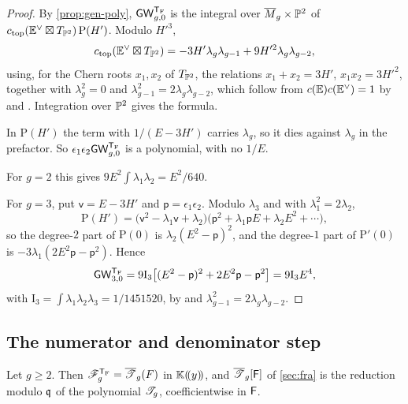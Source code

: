 \begin{proof}
By \cref{prop:gen-poly}, $\mathsf{GW}_{g,0}^{\mathsf{T}_{\mathrm{F}}}$ is the integral over $\overline{M}_g\times\mathbb{P}^2$ of $c_{\mathrm{top}}(\mathbb{E}^\vee\boxtimes T_{\mathbb{P}^2})\,\mathrm{P}(H')$. Modulo $H'^3$,
\[
c_{\mathrm{top}}(\mathbb{E}^\vee\boxtimes T_{\mathbb{P}^2})=-3H'\lambda_g\lambda_{g-1}+9H'^2\lambda_g\lambda_{g-2},
\]
using, for the Chern roots $x_1,x_2$ of $T_{\mathbb{P}^2}$, the relations $x_1+x_2=3H'$, $x_1x_2=3H'^2$, together with $\lambda_g^2=0$ and $\lambda_{g-1}^2=2\lambda_g\lambda_{g-2}$, which follow from $c(\mathbb{E})c(\mathbb{E}^\vee)=1$ by \cite[(5.4), (5.5)]{Mum83} and \cite[Section~2, before (22)]{FP00}. Integration over $\mathbb{P}^2$ gives the formula.

In $\mathrm{P}(H')$ the term with $1/(E-3H')$ carries $\lambda_g$, so it dies against $\lambda_g$ in the prefactor. So $\epsilon_1\epsilon_2\mathsf{GW}_{g,0}^{\mathsf{T}_{\mathrm{F}}}$ is a polynomial, with no $1/E$.

For $g=2$ this gives $9E^2\int\lambda_1\lambda_2=E^2/640$.

For $g=3$, put $\mathsf{v}=E-3H'$ and $\mathsf{p}=\epsilon_1\epsilon_2$. Modulo $\lambda_3$ and with $\lambda_1^2=2\lambda_2$,
\[
\mathrm{P}(H')=\big(\mathsf{v}^2-\lambda_1\mathsf{v}+\lambda_2\big)\big(\mathsf{p}^2+\lambda_1\mathsf{p}E+\lambda_2E^2+\cdots\big),
\]
so the degree-$2$ part of $\mathrm{P}(0)$ is $\lambda_2(E^2-\mathsf{p})^2$, and the degree-$1$ part of $\mathrm{P}'(0)$ is $-3\lambda_1(2E^2\mathsf{p}-\mathsf{p}^2)$. Hence
\[
\mathsf{GW}_{3,0}^{\mathsf{T}_{\mathrm{F}}}=9\mathrm{I}_3\big[(E^2-\mathsf{p})^2+2E^2\mathsf{p}-\mathsf{p}^2\big]=9\mathrm{I}_3E^4,
\]
with $\mathrm{I}_3=\int\lambda_1\lambda_2\lambda_3=1/1451520$, by \cite[Theorem~4]{FP00} and $\lambda_{g-1}^2=2\lambda_g\lambda_{g-2}$.
\end{proof}

\subsection{The numerator and denominator step}

\begin{lem}
\label{lem:spe-numden}
Let $g\geq2$. Then $\mathscr{F}_g^{\mathsf{T}_{\mathrm{F}}}=\overline{\mathscr{T}}_g(F)$ in $\mathbb{K}(\!(y)\!)$, and $\overline{\mathscr{T}}_g[\mathsf{F}]$ of \cref{sec:fra} is the reduction modulo $\mathfrak{q}$ of the polynomial $\mathscr{T}_g$, coefficientwise in $\mathsf{F}$.
\end{lem}

